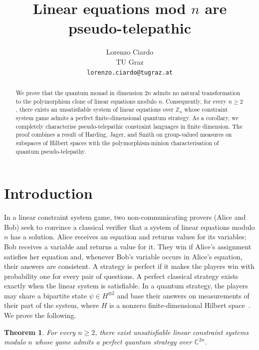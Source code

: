 \documentclass[11pt]{article}
\title{Linear equations mod $n$ are pseudo-telepathic}
\author{Lorenzo Ciardo\\
TU Graz\\
\texttt{lorenzo.ciardo@tugraz.at}
}
\date{}
\newcommand{\C}{\mathbb C}
\newcommand{\Z}{\mathbb Z}
\theoremstyle{plain}
\newtheorem{theorem}{Theorem}
\theoremstyle{definition}
\theoremstyle{remark}
\begin{document}
\maketitle

\begin{abstract}
We prove that the quantum monad in dimension
$2n$ admits no natural transformation to the polymorphism clone of
linear equations modulo $n$. Consequently, for every $n\geq 2$, there exists an unsatisfiable system of linear
equations over $\Z_n$ whose constraint system
game admits a perfect finite-dimensional quantum strategy. As a corollary, we completely characterise pseudo-telepathic constraint languages in finite dimension.
The proof combines a result of Harding, Jager, and Smith on group-valued
measures on subspaces of Hilbert spaces with the polymorphism-minion characterisation of
quantum pseudo-telepathy.
\end{abstract}

\section{Introduction}
\label{sec_intro}

In a linear constraint system game, two non-communicating provers (Alice and Bob) seek to convince a classical verifier that a system of linear equations modulo $n$ has a solution. Alice receives an equation and returns values for its variables; Bob receives a variable and returns a value for it. They win if Alice's assignment satisfies her equation and, whenever Bob's variable occurs in Alice's
equation, their answers are consistent. A strategy is perfect if it makes the players win with probability one for every pair of questions. A perfect classical strategy exists exactly when the linear system is satisfiable.
In a quantum strategy, the players may share a bipartite state $\psi\in H^{\otimes2}$ and base their answers on measurements of their part of the system, where $H$ is a nonzero finite-dimensional
Hilbert space~\cite{CleveM14}. 
%
We prove the following.



\begin{theorem}
\label{thm_main_pseudo_telepathy}
    For every $n\geq 2$, there exist unsatisfiable linear constraint systems modulo $n$ whose game admits a perfect quantum strategy over $\C^{2n}$.
\end{theorem}
\end{document}
